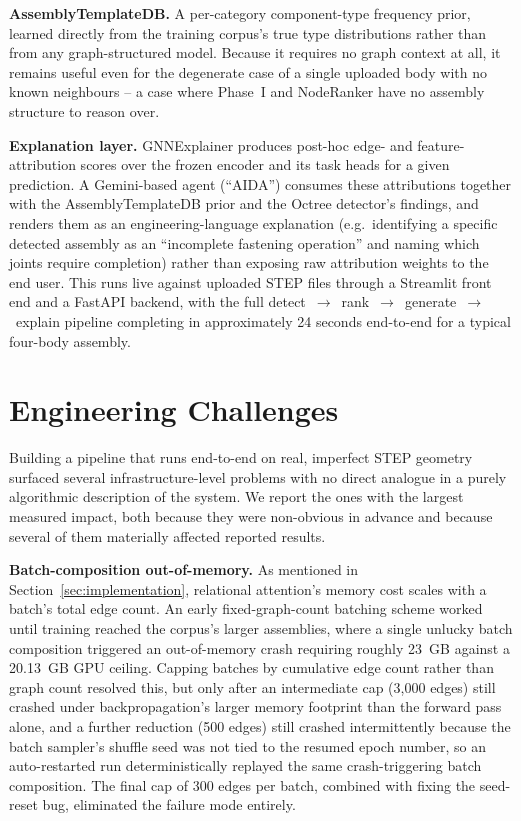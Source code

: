 \documentclass[sn-mathphys,Numbered]{sn-jnl}
\begin{document}
\textbf{AssemblyTemplateDB.} A per-category component-type frequency prior, learned directly from the training corpus's true type distributions rather than from any graph-structured model. Because it requires no graph context at all, it remains useful even for the degenerate case of a single uploaded body with no known neighbours -- a case where Phase~I and NodeRanker have no assembly structure to reason over.

\textbf{Explanation layer.} GNNExplainer \cite{ying2019gnnexplainer} produces post-hoc edge- and feature-attribution scores over the frozen encoder and its task heads for a given prediction. A Gemini-based agent (``AIDA'') consumes these attributions together with the AssemblyTemplateDB prior and the Octree detector's findings, and renders them as an engineering-language explanation (e.g.\ identifying a specific detected assembly as an ``incomplete fastening operation'' and naming which joints require completion) rather than exposing raw attribution weights to the end user. This runs live against uploaded STEP files through a Streamlit front end and a FastAPI backend, with the full detect~$\to$~rank~$\to$~generate~$\to$~explain pipeline completing in approximately 24 seconds end-to-end for a typical four-body assembly.

\section{Engineering Challenges}\label{sec:engineering}

Building a pipeline that runs end-to-end on real, imperfect STEP geometry surfaced several infrastructure-level problems with no direct analogue in a purely algorithmic description of the system. We report the ones with the largest measured impact, both because they were non-obvious in advance and because several of them materially affected reported results.

\textbf{Batch-composition out-of-memory.} As mentioned in Section~\ref{sec:implementation}, relational attention's memory cost scales with a batch's total edge count. An early fixed-graph-count batching scheme worked until training reached the corpus's larger assemblies, where a single unlucky batch composition triggered an out-of-memory crash requiring roughly 23~GB against a 20.13~GB GPU ceiling. Capping batches by cumulative edge count rather than graph count resolved this, but only after an intermediate cap (3{,}000 edges) still crashed under backpropagation's larger memory footprint than the forward pass alone, and a further reduction (500 edges) still crashed intermittently because the batch sampler's shuffle seed was not tied to the resumed epoch number, so an auto-restarted run deterministically replayed the same crash-triggering batch composition. The final cap of 300 edges per batch, combined with fixing the seed-reset bug, eliminated the failure mode entirely.
\end{document}
